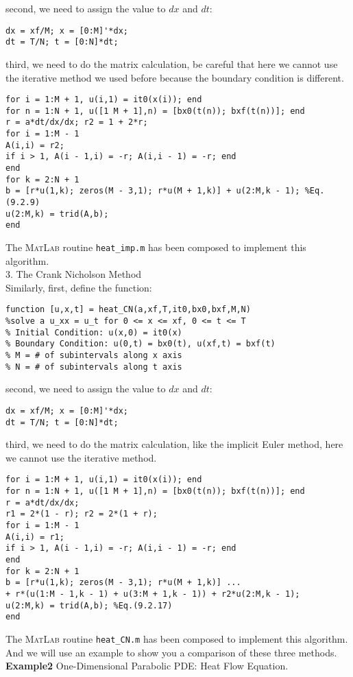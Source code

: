 \documentclass[a4paper]{article}
\begin{document}
second, we need to assign the value to $dx$ and $dt$:
\begin{verbatim}
dx = xf/M; x = [0:M]'*dx;
dt = T/N; t = [0:N]*dt;
\end{verbatim}
third, we need to do the matrix calculation, be careful that here we cannot use the iterative method we used before because the boundary condition is different.
\begin{verbatim}
for i = 1:M + 1, u(i,1) = it0(x(i)); end
for n = 1:N + 1, u([1 M + 1],n) = [bx0(t(n)); bxf(t(n))]; end
r = a*dt/dx/dx; r2 = 1 + 2*r;
for i = 1:M - 1
A(i,i) = r2;
if i > 1, A(i - 1,i) = -r; A(i,i - 1) = -r; end
end
for k = 2:N + 1
b = [r*u(1,k); zeros(M - 3,1); r*u(M + 1,k)] + u(2:M,k - 1); %Eq.(9.2.9)
u(2:M,k) = trid(A,b);
end
\end{verbatim}
  The \textsc{MatLab} routine \verb$heat_imp.m$ has been composed to implement this algorithm.\\
3. The Crank Nicholson Method\\
Similarly, first, define the function:
\begin{verbatim}
function [u,x,t] = heat_CN(a,xf,T,it0,bx0,bxf,M,N)
%solve a u_xx = u_t for 0 <= x <= xf, 0 <= t <= T
% Initial Condition: u(x,0) = it0(x)
% Boundary Condition: u(0,t) = bx0(t), u(xf,t) = bxf(t)
% M = # of subintervals along x axis
% N = # of subintervals along t axis
\end{verbatim}
second, we need to assign the value to $dx$ and $dt$:
\begin{verbatim}
dx = xf/M; x = [0:M]'*dx;
dt = T/N; t = [0:N]*dt;
\end{verbatim}
third, we need to do the matrix calculation, like the implicit Euler method, here we cannot use the iterative method.
\begin{verbatim}
for i = 1:M + 1, u(i,1) = it0(x(i)); end
for n = 1:N + 1, u([1 M + 1],n) = [bx0(t(n)); bxf(t(n))]; end
r = a*dt/dx/dx;
r1 = 2*(1 - r); r2 = 2*(1 + r);
for i = 1:M - 1
A(i,i) = r1;
if i > 1, A(i - 1,i) = -r; A(i,i - 1) = -r; end
end
for k = 2:N + 1
b = [r*u(1,k); zeros(M - 3,1); r*u(M + 1,k)] ...
+ r*(u(1:M - 1,k - 1) + u(3:M + 1,k - 1)) + r2*u(2:M,k - 1);
u(2:M,k) = trid(A,b); %Eq.(9.2.17)
end
\end{verbatim}
  The \textsc{MatLab} routine \verb$heat_CN.m$ has been composed to implement this algorithm.\\
And we will use an example to show you a comparison of these three methods.\\
\textbf{Example2} One-Dimensional Parabolic PDE: Heat Flow Equation.\\
\end{document}
